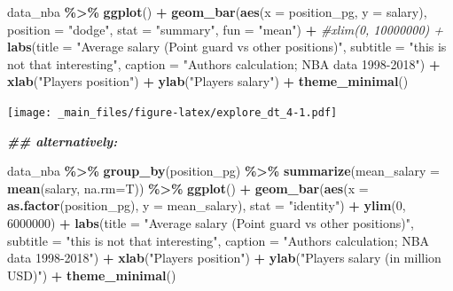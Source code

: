 \documentclass[
]{book}
\newenvironment{Shaded}{\begin{snugshade}}{\end{snugshade}}
\newcommand{\AttributeTok}[1]{\textcolor[rgb]{0.13,0.29,0.53}{#1}}
\newcommand{\CommentTok}[1]{\textcolor[rgb]{0.56,0.35,0.01}{\textit{#1}}}
\newcommand{\DecValTok}[1]{\textcolor[rgb]{0.00,0.00,0.81}{#1}}
\newcommand{\DocumentationTok}[1]{\textcolor[rgb]{0.56,0.35,0.01}{\textbf{\textit{#1}}}}
\newcommand{\FunctionTok}[1]{\textcolor[rgb]{0.13,0.29,0.53}{\textbf{#1}}}
\newcommand{\NormalTok}[1]{#1}
\newcommand{\SpecialCharTok}[1]{\textcolor[rgb]{0.81,0.36,0.00}{\textbf{#1}}}
\newcommand{\StringTok}[1]{\textcolor[rgb]{0.31,0.60,0.02}{#1}}
\begin{document}
\begin{Shaded}
\begin{Highlighting}[]
\NormalTok{data\_nba }\SpecialCharTok{\%\textgreater{}\%} 
  \FunctionTok{ggplot}\NormalTok{() }\SpecialCharTok{+}
  \FunctionTok{geom\_bar}\NormalTok{(}\FunctionTok{aes}\NormalTok{(}\AttributeTok{x =}\NormalTok{ position\_pg, }
               \AttributeTok{y =}\NormalTok{ salary),}
           \AttributeTok{position =} \StringTok{"dodge"}\NormalTok{,}
           \AttributeTok{stat =} \StringTok{"summary"}\NormalTok{,}
           \AttributeTok{fun =} \StringTok{"mean"}\NormalTok{) }\SpecialCharTok{+} 
  \CommentTok{\#xlim(0, 10000000) +}
  \FunctionTok{labs}\NormalTok{(}\AttributeTok{title =} \StringTok{"Average salary (Point guard vs other positions)"}\NormalTok{,}
       \AttributeTok{subtitle =} \StringTok{"this is not that interesting"}\NormalTok{,}
       \AttributeTok{caption =} \StringTok{"Authors\textquotesingle{} calculation; NBA data 1998{-}2018"}\NormalTok{) }\SpecialCharTok{+}
  \FunctionTok{xlab}\NormalTok{(}\StringTok{"Player\textquotesingle{}s position"}\NormalTok{) }\SpecialCharTok{+}
  \FunctionTok{ylab}\NormalTok{(}\StringTok{"Player\textquotesingle{}s salary"}\NormalTok{) }\SpecialCharTok{+}
  \FunctionTok{theme\_minimal}\NormalTok{()}
\end{Highlighting}
\end{Shaded}

\texttt{[image: \_main\_files/figure-latex/explore\_dt\_4-1.pdf]}

\begin{Shaded}
\begin{Highlighting}[]
\DocumentationTok{\#\# alternatively:}

\NormalTok{data\_nba }\SpecialCharTok{\%\textgreater{}\%} 
  \FunctionTok{group\_by}\NormalTok{(position\_pg) }\SpecialCharTok{\%\textgreater{}\%}
  \FunctionTok{summarize}\NormalTok{(}\AttributeTok{mean\_salary =} \FunctionTok{mean}\NormalTok{(salary, }\AttributeTok{na.rm=}\NormalTok{T)) }\SpecialCharTok{\%\textgreater{}\%}
  \FunctionTok{ggplot}\NormalTok{() }\SpecialCharTok{+}
  \FunctionTok{geom\_bar}\NormalTok{(}\FunctionTok{aes}\NormalTok{(}\AttributeTok{x =} \FunctionTok{as.factor}\NormalTok{(position\_pg), }
               \AttributeTok{y =}\NormalTok{ mean\_salary),}
           \AttributeTok{stat =} \StringTok{"identity"}\NormalTok{) }\SpecialCharTok{+} 
  \FunctionTok{ylim}\NormalTok{(}\DecValTok{0}\NormalTok{, }\DecValTok{6000000}\NormalTok{) }\SpecialCharTok{+}
  \FunctionTok{labs}\NormalTok{(}\AttributeTok{title =} \StringTok{"Average salary (Point guard vs other positions)"}\NormalTok{,}
       \AttributeTok{subtitle =} \StringTok{"this is not that interesting"}\NormalTok{,}
       \AttributeTok{caption =} \StringTok{"Authors\textquotesingle{} calculation; NBA data 1998{-}2018"}\NormalTok{) }\SpecialCharTok{+}
  \FunctionTok{xlab}\NormalTok{(}\StringTok{"Player\textquotesingle{}s position"}\NormalTok{) }\SpecialCharTok{+}
  \FunctionTok{ylab}\NormalTok{(}\StringTok{"Player\textquotesingle{}s salary (in million USD)"}\NormalTok{) }\SpecialCharTok{+}
  \FunctionTok{theme\_minimal}\NormalTok{()}
\end{Highlighting}
\end{Shaded}
\end{document}
